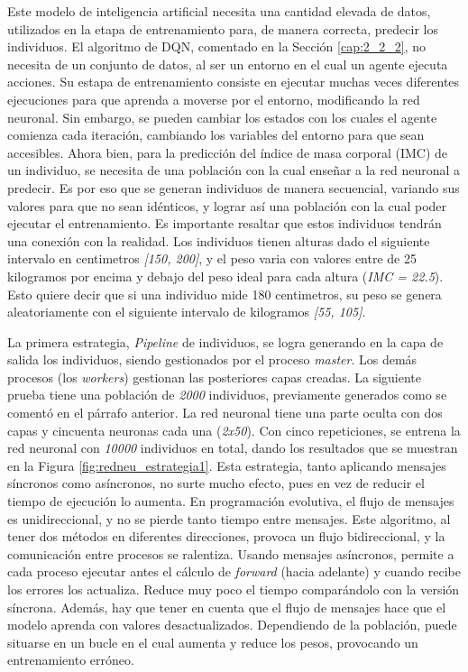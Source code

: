 	Este modelo de inteligencia artificial necesita una cantidad elevada de datos, utilizados en la etapa de entrenamiento para, de manera correcta, predecir los individuos. El algoritmo de DQN, comentado en la Sección \ref{cap:2_2_2}, no necesita de un conjunto de datos, al ser un entorno en el cual un agente ejecuta acciones. Su estapa de entrenamiento consiste en ejecutar muchas veces diferentes ejecuciones para que aprenda a moverse por el entorno, modificando la red neuronal. Sin embargo, se pueden cambiar los estados con los cuales el agente comienza cada iteración, cambiando los variables del entorno para que sean accesibles. Ahora bien, para la predicción del índice de masa corporal (IMC) de un individuo, se necesita de una población con la cual enseñar a la red neuronal a predecir. Es por eso que se generan individuos de manera secuencial, variando sus valores para que no sean idénticos, y lograr así una población con la cual poder ejecutar el entrenamiento. Es importante resaltar que estos individuos tendrán una conexión con la realidad. Los individuos tienen alturas dado el siguiente intervalo en centimetros \textit{[150, 200]}, y el peso varia con valores entre de 25 kilogramos por encima y debajo del peso ideal para cada altura (\textit{IMC = 22.5}). Esto quiere decir que si una individuo mide 180 centimetros, su peso se genera aleatoriamente con el siguiente intervalo de kilogramos \textit{[55, 105]}.
		
	
		La primera estrategia, \textit{Pipeline} de individuos, se logra generando en la capa de salida los individuos, siendo gestionados por el proceso \textit{master}. Los demás procesos (los \textit{workers}) gestionan las posteriores capas creadas. La siguiente prueba tiene una población de \textit{2000} individuos, previamente generados como se comentó en el párrafo anterior. La red neuronal tiene una parte oculta con dos capas y cincuenta neuronas cada una (\textit{2x50}). Con cinco repeticiones, se entrena la red neuronal con \textit{10000} individuos en total, dando los resultados que se muestran en la Figura \ref{fig:redneu_estrategia1}. Esta estrategia, tanto aplicando mensajes síncronos como asíncronos, no surte mucho efecto, pues en vez de reducir el tiempo de ejecución lo aumenta. En programación evolutiva, el flujo de mensajes es unidireccional, y no se pierde tanto tiempo entre mensajes. Este algoritmo, al tener dos métodos en diferentes direcciones, provoca un flujo bidireccional, y la comunicación entre procesos se ralentiza. Usando mensajes asíncronos, permite a cada proceso ejecutar antes el cálculo de \textit{forward} (hacia adelante) y cuando recibe los errores los actualiza. Reduce muy poco el tiempo comparándolo con la versión síncrona. Además, hay que tener en cuenta que el flujo de mensajes hace que el modelo aprenda con valores desactualizados. Dependiendo de la población, puede situarse en un bucle en el cual aumenta y reduce los pesos, provocando un entrenamiento erróneo.


